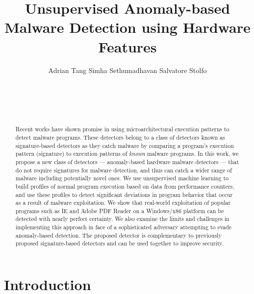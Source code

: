 \documentclass{acm_proc_article-sp}
\begin{document}
\title{Unsupervised Anomaly-based Malware Detection using Hardware Features}

\author{
\alignauthor
Adrian Tang \hspace{0.2in} Simha Sethumadhavan \hspace{0.2in} Salvatore Stolfo\\
	   \confname{\hspace{1in}}\\
       \\
       \\
       \\
}


\date{}
\maketitle

\thispagestyle{empty}

\begin{abstract} 

Recent works have shown promise in using microarchitectural execution
patterns to detect malware programs. These detectors belong to a
class of detectors known as signature-based detectors as they
catch malware by comparing a program's execution pattern (signature)
to execution patterns of \emph{known} malware programs.  In this
work, we propose a new class of detectors --- anomaly-based hardware
malware detectors --- that do not require signatures for malware
detection, and thus can catch a wider range of malware including
potentially novel ones.  We use unsupervised machine learning to
build profiles of normal program execution based on data from
performance counters, and use these profiles to detect significant
deviations in program behavior that occur as a result of malware
exploitation. We show that real-world exploitation of popular
programs such as IE and Adobe PDF Reader on a Windows/x86 platform
can be detected with nearly perfect certainty. We also examine the
limits and challenges in implementing this approach in face of a
sophisticated adversary attempting to evade anomaly-based detection.
The proposed detector is complementary to previously proposed
signature-based detectors and can be used together to improve
security.

\end{abstract}


\section{Introduction}
\end{document}
